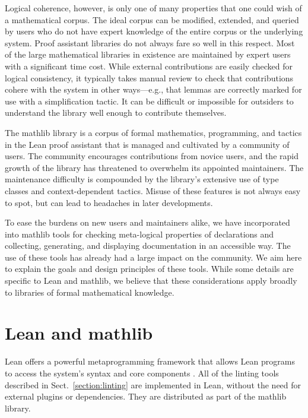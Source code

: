 \documentclass[runningheads]{llncs}
\newcommand{\mathlib}{\textsf{mathlib}\xspace}
\begin{document}
Logical coherence, however,
is only one of many properties
that one could wish of a mathematical corpus.
The ideal corpus can be modified, extended, and queried
by users who do not have expert knowledge of the entire corpus or the underlying system.
Proof assistant libraries do not always fare so well in this respect.
Most of the large mathematical libraries in existence
are maintained by expert users
with a significant time cost.
While external contributions are easily checked for logical consistency,
it typically takes manual review to check that contributions cohere with the system in other ways---e.g.,
that lemmas are correctly marked for use with a simplification tactic.
It can be difficult or impossible for outsiders
to understand the library well enough to contribute themselves.

The \mathlib library \cite{mathlib20} is a corpus
of formal mathematics, programming, and tactics
in the Lean proof assistant \cite{Mour15a}
that is managed and cultivated by a community of users.
The community encourages contributions from novice users,
and the rapid growth of the library has threatened to overwhelm its appointed maintainers.
The maintenance difficulty is compounded by
the library's extensive use of type classes and context-dependent tactics.
Misuse of these features is not always easy to spot,
but can lead to headaches in later developments.

To ease the burdens on new users and maintainers alike,
we have incorporated into \mathlib tools for
checking meta-logical properties of declarations
and collecting, generating, and displaying documentation in an accessible way.
The use of these tools has already had a large impact on the community.
We aim here to explain the goals and design principles of these tools.
While some details are specific to Lean and \mathlib,
we believe that these considerations apply broadly
to libraries of formal mathematical knowledge.

\section{Lean and \mathlib}
\label{section:lean}

Lean offers a powerful metaprogramming framework
that allows Lean programs to access the system's syntax and core components \cite{EURAM17}.
All of the linting tools described in Sect.~\ref{section:linting}
are implemented in Lean,
without the need for external plugins or dependencies.
They are distributed as part of the \mathlib library.
\end{document}

